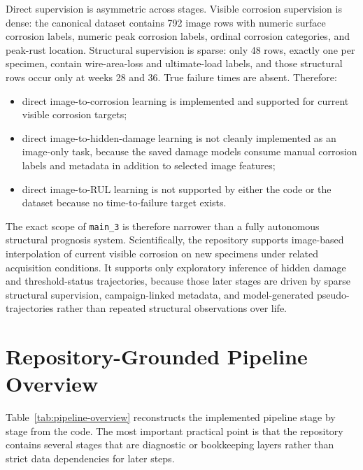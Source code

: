 \documentclass[11pt,a4paper]{article}
\begin{document}
Direct supervision is asymmetric across stages. Visible corrosion supervision is dense: the canonical dataset contains 792 image rows with numeric surface corrosion labels, numeric peak corrosion labels, ordinal corrosion categories, and peak-rust location. Structural supervision is sparse: only 48 rows, exactly one per specimen, contain wire-area-loss and ultimate-load labels, and those structural rows occur only at weeks 28 and 36. True failure times are absent. Therefore:
\begin{itemize}
  \item direct image-to-corrosion learning is implemented and supported for current visible corrosion targets;
  \item direct image-to-hidden-damage learning is not cleanly implemented as an image-only task, because the saved damage models consume manual corrosion labels and metadata in addition to selected image features;
  \item direct image-to-RUL learning is not supported by either the code or the dataset because no time-to-failure target exists.
\end{itemize}

The exact scope of \texttt{main\_3} is therefore narrower than a fully autonomous structural prognosis system. Scientifically, the repository supports image-based interpolation of current visible corrosion on new specimens under related acquisition conditions. It supports only exploratory inference of hidden damage and threshold-status trajectories, because those later stages are driven by sparse structural supervision, campaign-linked metadata, and model-generated pseudo-trajectories rather than repeated structural observations over life.

\section{Repository-Grounded Pipeline Overview}

Table~\ref{tab:pipeline-overview} reconstructs the implemented pipeline stage by stage from the code. The most important practical point is that the repository contains several stages that are diagnostic or bookkeeping layers rather than strict data dependencies for later steps.
\end{document}
